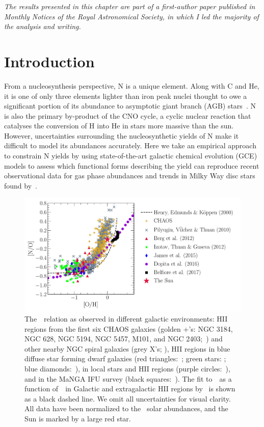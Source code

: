 
\begin{center}
\textit{
	The results presented in this chapter are part of a first-author paper
	published in Monthly Notices of the Royal Astronomical Society, in which I
	led the majority of the analysis and writing.
}
\end{center}

\section{Introduction}
\label{ohno:sec:intro}
From a nucleosynthesis perspective, N is a unique element.
Along with C and He, it is one of only three elements lighter
than iron peak nuclei thought to owe a significant portion of its abundance
to asymptotic giant branch (AGB) stars~\citep[e.g.][]{Johnson2019}.
N is also the primary by-product of the CNO cycle, a cyclic nuclear reaction
that catalyses the conversion of H into He in stars more massive than the sun.
However, uncertainties surrounding the nucleosynthetic yields of N make it
difficult to model its abundances accurately.
Here we take an empirical approach to constrain N yields by using
state-of-the-art galactic chemical evolution (GCE) models to assess which
functional forms describing the yield can reproduce recent observational
data for gas phase abundances and trends in Milky Way disc stars found
by~\citet{Vincenzo2021b}.

\begin{figure}
\centering
\includegraphics[scale = 0.65]{no_oh_observed.pdf}
\caption{
	The~\ohno~relation as observed in different galactic environments:
	HII regions from the first six CHAOS galaxies (golden +'s: NGC 3184, NGC
	628, NGC 5194, NGC 5457, M101, and NGC 2403;~\citealp{Berg2020,
	Skillman2020, Rogers2021}) and other nearby NGC spiral galaxies (grey X's;
	\citealp[][``ONS'' calibration]{Pilyugin2010}), HII regions in blue diffuse
	star forming dwarf galaxies (red triangles:~\citealp{Berg2012}; green stars:
	\citealp{Izotov2012}; blue diamonds:~\citealp{James2015}), in local stars
	and HII regions (purple circles:~\citealp{Dopita2016}), and in the MaNGA
	IFU survey (black squares:~\citealp{Belfiore2017}).
	The fit to~\no~as a function of~\oh~in Galactic and extragalactic HII
	regions by~\citet{Henry2000} is shown as a black dashed line.
	We omit all uncertainties for visual clarity.
	All data have been normalized to the~\citet{Asplund2009} solar abundances,
	and the Sun is marked by a large red star.
}
\label{ohno:fig:no_oh_observed}
\end{figure}

